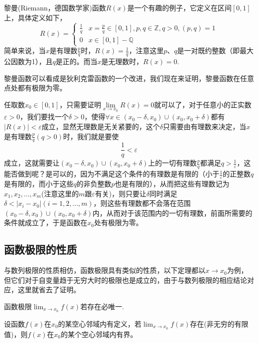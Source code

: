 \begin{example}
  \label{example:limit-of-riemann-function}
  黎曼(Riemann，德国数学家)函数$R(x)$是一个有趣的例子，它定义在区间$[0,1]$上，具体定义如下，
  \[ R(x) =
    \begin{cases}
      \frac{1}{q} & x=\frac{p}{q} \in [0,1], p,q \in \mathbb{Z}, q >0, (p,q)=1 \\
      0 & x \in [0,1]-\mathbb{Q}
    \end{cases}
  \]
  简单来说，当$x$是有理数$\frac{p}{q}$时，$R(x)=\frac{1}{q}$，注意这里$p$、$q$是一对既约整数（即最大公因数为1），且$q$是正的。而当$x$是无理数时，$R(x)=0$.

  黎曼函数可以看成是狄利克雷函数的一个改进，我们现在来证明，黎曼函数在任意点处都有极限为零。

  任取数$x_0 \in [0,1]$，只需要证明$\lim\limits_{x \to x_0} R(x)=0$就可以了，对于任意小的正实数$\varepsilon>0$，我们要找一个$\delta>0$，使得$\forall x \in (x_0-\delta,x_0)\cup(x_0,x_0+\delta)$都有$|R(x)|<\varepsilon$成立，显然无理数是无关紧要的，这个$\delta$只需要由有理数来决定，当$x$是有理数$\frac{p}{q}(q>0)$时，我们就是要使
  \[ \frac{1}{q} < \varepsilon \]
  成立，这就需要让$(x_0-\delta,x_0)\cup(x_0,x_0+\delta)$上的一切有理数$\frac{p}{q}$都满足$q > \frac{1}{\varepsilon}$，这能否做到呢？是可以的，因为不满足这个条件的有理数是有限的（小于$\frac{1}{\varepsilon}$的正整数$q$是有限的，而小于这些$q$的非负整数$p$也是有限的），从而把这些有理数记为$x_1,x_2,\ldots,x_m$(注意这里的$m$跟$\varepsilon$有关)，则只要让$\delta$同时满足$\delta < |x_i-x_0|(i=1,2,\ldots,m)$，则这些有理数都不会落在范围$(x_0-\delta,x_0)\cup(x_0,x_0+\delta)$内，从而对于该范围内的一切有理数，前面所需要的条件就成立了，于是函数在$x_0$处有极限为零。
\end{example}
\subsection{函数极限的性质}
\label{sec:properties-of-function-limit}


与数列极限的性质相仿，函数极限具有类似的性质，以下定理都以$x\to x_0$为例，但它们对于自变量趋于无穷大时的极限也是成立的，由于与数列极限的相应结论对应，这里就省去了证明。

\begin{property}[唯一性]
  函数极限$\lim_{x \to x_0}f(x)$若存在必唯一.
\end{property}

\begin{theorem}[局部有界性]
  设函数$f(x)$在$x_0$的某空心邻域内有定义，若$\lim_{x \to x_0}f(x)$存在(非无穷的有限值)，则$f(x)$在$x_0$的某个空心邻域内有界。
\end{theorem}

